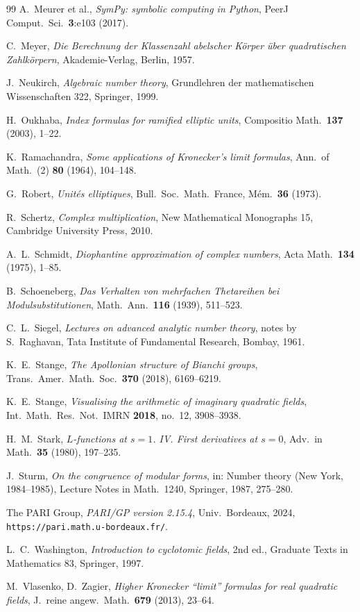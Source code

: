 \documentclass[11pt]{amsart}
\numberwithin{equation}{section}
\theoremstyle{plain}
\theoremstyle{definition}
\theoremstyle{remark}
\begin{document}
\begin{thebibliography}{99}
A.~Meurer et al.,
\emph{SymPy: symbolic computing in Python},
PeerJ Comput.\ Sci.\ \textbf{3}:e103 (2017).

C.~Meyer,
\emph{Die Berechnung der Klassenzahl abelscher K\"orper \"uber
quadratischen Zahlk\"orpern},
Akademie-Verlag, Berlin, 1957.

J.~Neukirch,
\emph{Algebraic number theory},
Grundlehren der mathematischen Wissenschaften 322, Springer, 1999.

H.~Oukhaba,
\emph{Index formulas for ramified elliptic units},
Compositio Math.\ \textbf{137} (2003), 1--22.

K.~Ramachandra,
\emph{Some applications of Kronecker's limit formulas},
Ann.\ of Math.\ (2) \textbf{80} (1964), 104--148.

G.~Robert,
\emph{Unit\'es elliptiques},
Bull.\ Soc.\ Math.\ France, M\'em.\ \textbf{36} (1973).

R.~Schertz,
\emph{Complex multiplication},
New Mathematical Monographs 15, Cambridge University Press, 2010.

A.~L.~Schmidt,
\emph{Diophantine approximation of complex numbers},
Acta Math.\ \textbf{134} (1975), 1--85.

B.~Schoeneberg,
\emph{Das Verhalten von mehrfachen Thetareihen bei
Modulsubstitutionen},
Math.\ Ann.\ \textbf{116} (1939), 511--523.

C.~L.~Siegel,
\emph{Lectures on advanced analytic number theory},
notes by S.~Raghavan, Tata Institute of Fundamental Research, Bombay,
1961.

K.~E.~Stange,
\emph{The Apollonian structure of Bianchi groups},
Trans.\ Amer.\ Math.\ Soc.\ \textbf{370} (2018), 6169--6219.

K.~E.~Stange,
\emph{Visualising the arithmetic of imaginary quadratic fields},
Int.\ Math.\ Res.\ Not.\ IMRN \textbf{2018}, no.\ 12, 3908--3938.

H.~M.~Stark,
\emph{$L$-functions at $s = 1$. IV. First derivatives at $s = 0$},
Adv.\ in Math.\ \textbf{35} (1980), 197--235.

J.~Sturm,
\emph{On the congruence of modular forms},
in: Number theory (New York, 1984--1985), Lecture Notes in Math.\ 1240,
Springer, 1987, 275--280.

The PARI Group,
\emph{PARI/GP version 2.15.4}, Univ.\ Bordeaux, 2024,
\texttt{https://pari.math.u-bordeaux.fr/}.

L.~C.~Washington,
\emph{Introduction to cyclotomic fields},
2nd ed., Graduate Texts in Mathematics 83, Springer, 1997.

M.~Vlasenko, D.~Zagier,
\emph{Higher Kronecker ``limit'' formulas for real quadratic fields},
J.\ reine angew.\ Math.\ \textbf{679} (2013), 23--64.

\end{thebibliography}
\end{document}
